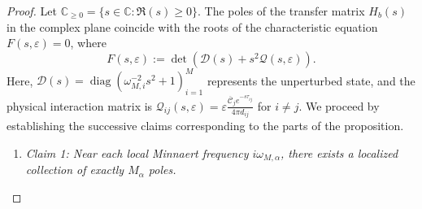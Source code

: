 \documentclass[11pt,a4paper]{article}
\numberwithin{equation}{section}
\begin{document}
\begin{proof}
Let $\mathbb{C}_{\ge 0} = \{s \in \mathbb{C} : \Re(s) \ge 0\}$. The poles of the transfer matrix $H_b(s)$ in the complex plane coincide with the roots of the characteristic equation $F(s, \varepsilon) = 0$, where
\[
    F(s, \varepsilon) := \det\left( \mathcal{D}(s) + s^2 \mathcal{Q}(s, \varepsilon) \right).
\]
Here, $\mathcal{D}(s) = \operatorname{diag}(\omega_{M,i}^{-2} s^2 + 1)_{i=1}^M$ represents the unperturbed state, and the physical interaction matrix is $\mathcal{Q}_{ij}(s, \varepsilon) = \varepsilon \frac{\overline{\mathcal{C}}_j e^{-s\tau_{ij}}}{4\pi d_{ij}}$ for $i \neq j$. We proceed by establishing the successive claims corresponding to the parts of the proposition.

\begin{enumerate}
    \item \textit{Claim 1: Near each local Minnaert frequency $i\omega_{M,\alpha}$, there exists a localized collection of exactly $M_\alpha$ poles.}


\end{enumerate}
\end{proof}
\end{document}
